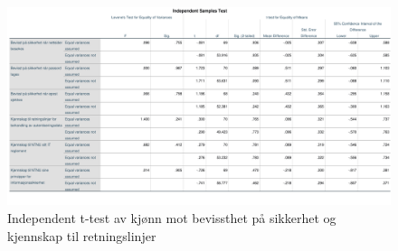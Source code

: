 \begin{figure}[H]
    \centering
    \includegraphics[scale=0.4]{case_2/bilder/spss/anova_ttest/kjonn_bevissthetogkjennskap_ttest.pdf}
    \caption[T-test av kjønn mot bevissthet på sikkerhet og kjennskap til retningslinjer]{Independent t-test av kjønn mot bevissthet på sikkerhet og kjennskap til retningslinjer}
    \label{fig:kjonn-bevissthetogkjennskap-ttest}
\end{figure}